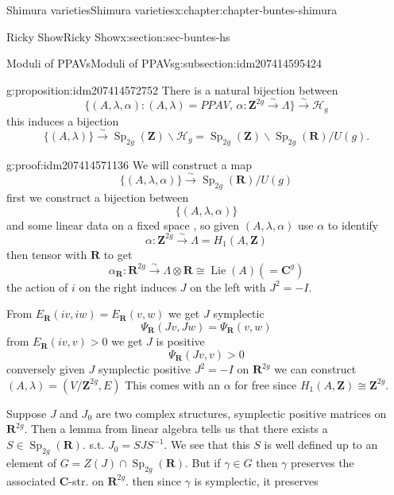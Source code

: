 \documentclass[oneside,10pt,]{book}
\numberwithin{equation}{section}
\DeclareMathOperator{\Lie}{Lie}
\newcommand{\inv}{^{-1}}
\newcommand{\ZZ}{\mathbf{Z}}
\newcommand{\RR}{\mathbf{R}}
\newcommand{\CC}{\mathbf{C}}
\DeclareMathOperator{\Sp}{Sp}
\newcommand{\gt}{>}
\begin{document}
\begin{chapterptx}{Shimura varieties}{}{Shimura varieties}{}{}{x:chapter:chapter-buntes-shimura}
\begin{sectionptx}{Ricky Show}{}{Ricky Show}{}{}{x:section:sec-buntes-hs}
\begin{subsectionptx}{Moduli of PPAVs}{}{Moduli of PPAVs}{}{}{g:subsection:idm207414595424}
\begin{proposition}{}{}{g:proposition:idm207414572752}%
There is a natural bijection between%
\begin{equation*}
\{(A,\lambda, \alpha) : (A,\lambda)= PPAV,\,\alpha\colon \ZZ^{2g} \xrightarrow \sim \Lambda\} \xrightarrow\sim \mathscr H_g
\end{equation*}
this induces a  bijection%
\begin{equation*}
\{(A,\lambda) \} \xrightarrow \sim \Sp_{2g}(\ZZ) \backslash \mathscr H_g = \Sp_{2g}(\ZZ) \backslash \Sp_{2g} (\RR) / U(g)\text{.}
\end{equation*}
%
\end{proposition}
\begin{proofptx}{}{g:proof:idm207414571136}
We will construct a map%
\begin{equation*}
\{(A,\lambda ,\alpha)\} \xrightarrow\sim\Sp_{2g} (\RR)/U(g)
\end{equation*}
first we construct  a bijection between%
\begin{equation*}
\{(A,\lambda, \alpha)\}
\end{equation*}
and some linear data on a fixed space , so given \((A, \lambda, \alpha)\) use \(\alpha\) to identify%
\begin{equation*}
\alpha\colon \ZZ^{2g} \xrightarrow \sim \Lambda = H_1(A,\ZZ)
\end{equation*}
then  tensor with \(\RR\) to get%
\begin{equation*}
\alpha_\RR \colon \RR^{2g} \xrightarrow\sim \Lambda\otimes \RR \cong \Lie(A) (= \CC^g)
\end{equation*}
the action of \(i\) on the right induces \(J\) on the left with \(J^2 = -I\).%
\par
From \(E_\RR(iv,iw) = E_\RR(v,w)\) we get \(J \) symplectic%
\begin{equation*}
\Psi_\RR(Jv, Jw) = \Psi_\RR( v,w)
\end{equation*}
from \(E_\RR(iv,v) \gt 0\) we get \(J\) is positive%
\begin{equation*}
\Psi_\RR(Jv,v) \gt 0
\end{equation*}
conversely given \(J\) symplectic positive \(J^2 = -I\) on \(\RR^{2g}\) we can construct \((A,\lambda) = (V/\ZZ^{2g}, E)\) This comes with an \(\alpha\) for free since \(H_1(A, \ZZ) \cong \ZZ^{2g}\).%
\par
Suppose \(J\) and \(J_0\) are two complex structures, symplectic positive matrices on \(\RR^{2g}\). Then a lemma from linear algebra tells us that there exists a \(S \in \Sp_{2g}(\RR)\). s.t. \(J_0  = S J S \inv\). We see that this \(S\) is well defined up to an element of \(G = Z(J) \cap \Sp_{2g}(\RR)\). But if \(\gamma \in G \) then \(\gamma\) preserves the associated \(\CC\)-str. on \(\RR^{2g}\). then since \(\gamma\) is symplectic, it preserves%

\end{proofptx}
\end{subsectionptx}
\end{sectionptx}
\end{chapterptx}
\end{document}
